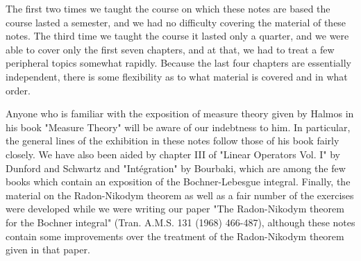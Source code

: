 The first two times we taught the course on which these notes are based the course lasted a semester, and we had no difficulty covering the material of these notes. The third time we taught the course it lasted only a quarter, and we were able to cover only the first seven chapters, and at that, we had to treat a few peripheral topics somewhat rapidly. Because the last four chapters are essentially independent, there is some flexibility as to what material is covered and in what order.

Anyone who is familiar with the exposition of measure theory given by Halmos in his book "Measure Theory" will be aware of our indebtness to him.  In particular, the general lines of the exhibition in these notes follow those of his book fairly closely.  We have also been aided by chapter III of "Linear Operators Vol. I" by Dunford and Schwartz and "Int\'{e}gration" by Bourbaki, which are among the few books which contain an exposition of the Bochner-Lebesgue integral. Finally, the material on the Radon-Nikodym theorem as well as a fair number of the exercises were developed while we were writing our paper "The Radon-Nikodym theorem for the Bochner integral" (Tran. A.M.S. 131 (1968) 466-487), although these notes contain some improvements over the treatment of the Radon-Nikodym theorem given in that paper.